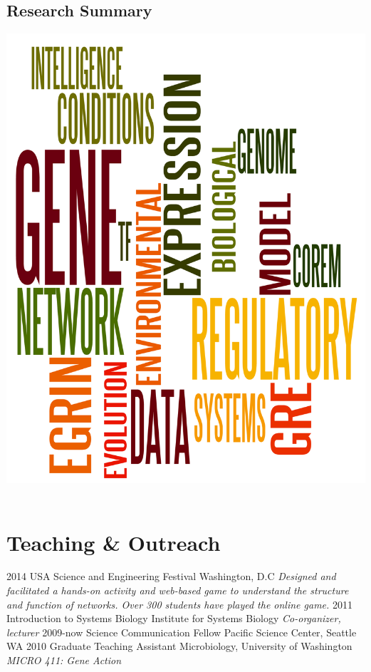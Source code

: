 \documentclass[]{friggeri-cv}
\begin{document}
\begin{aside}
  \section{Research Summary}
    \includegraphics[scale=0.28]{img/wordle_small.png}
    ~
\end{aside}

\section{Teaching \& Outreach}
\begin{entrylist}
  \entry
    {2014}
    {USA Science and Engineering Festival}
    {Washington, D.C}
    {\emph{Designed and facilitated a hands-on activity and web-based game to understand the structure and function of networks. Over 300 students have played the online game.}}
    \entry
    {2011}
    {Introduction to Systems Biology}
    {Institute for Systems Biology}
    {\emph{Co-organizer, lecturer}}
    \entry
    {2009-now}
    {Science Communication Fellow}
    {Pacific Science Center, Seattle WA}
    {}
    \entry
    {2010}
    {Graduate Teaching Assistant}
    {Microbiology, University of Washington}
    {\emph{MICRO 411: Gene Action}}
\end{entrylist}
\end{document}
